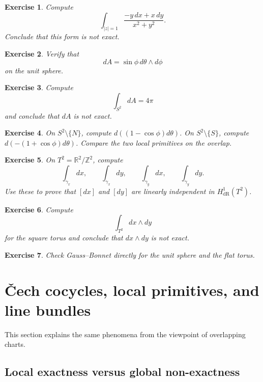 \documentclass[11pt]{article}
\newtheorem{exercise}{Exercise}
\begin{document}
	\begin{exercise}
		Compute
		\[
		\int_{|z|=1}\frac{-y\,dx+x\,dy}{x^2+y^2}.
		\]
		Conclude that this form is not exact.
	\end{exercise}
	
	\begin{exercise}
		Verify that
		\[
		dA=\sin\phi\,d\theta\wedge d\phi
		\]
		on the unit sphere.
	\end{exercise}
	
	\begin{exercise}
		Compute
		\[
		\int_{S^2}dA=4\pi
		\]
		and conclude that \(dA\) is not exact.
	\end{exercise}
	
	\begin{exercise}
		On \(S^2\setminus\{N\}\), compute \(d((1-\cos\phi)d\theta)\). On \(S^2\setminus\{S\}\), compute \(d(-(1+\cos\phi)d\theta)\). Compare the two local primitives on the overlap.
	\end{exercise}
	
	\begin{exercise}
		On \(T^2=\mathbb{R}^2/\mathbb{Z}^2\), compute
		\[
		\int_{\gamma_x}dx,\qquad \int_{\gamma_x}dy,\qquad
		\int_{\gamma_y}dx,\qquad \int_{\gamma_y}dy.
		\]
		Use these to prove that \([dx]\) and \([dy]\) are linearly independent in \(H^1_{\mathrm{dR}}(T^2)\).
	\end{exercise}
	
	\begin{exercise}
		Compute
		\[
		\int_{T^2}dx\wedge dy
		\]
		for the square torus and conclude that \(dx\wedge dy\) is not exact.
	\end{exercise}
	
	\begin{exercise}
		Check Gauss--Bonnet directly for the unit sphere and the flat torus.
	\end{exercise}

	\newpage
	\section{\v{C}ech cocycles, local primitives, and line bundles}
	
	This section explains the same phenomena from the viewpoint of overlapping charts.
	
	\subsection*{Local exactness versus global non-exactness}
	
\end{document}
